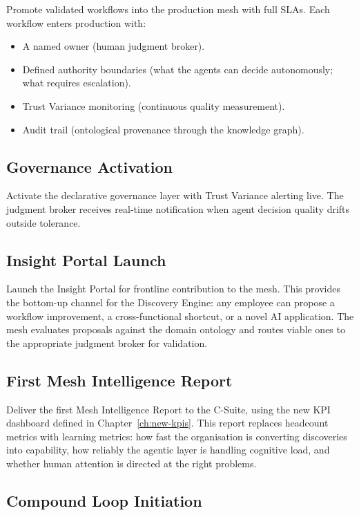 Promote validated workflows into the production mesh with full SLAs. Each workflow enters production with:

\begin{itemize}
  \item A named owner (human judgment broker).
  \item Defined authority boundaries (what the agents can decide autonomously; what requires escalation).
  \item Trust Variance monitoring (continuous quality measurement).
  \item Audit trail (ontological provenance through the knowledge graph).
\end{itemize}

\subsection{Governance Activation}

Activate the declarative governance layer with Trust Variance alerting live. The judgment broker receives real-time notification when agent decision quality drifts outside tolerance.

\subsection{Insight Portal Launch}

Launch the Insight Portal for frontline contribution to the mesh. This provides the bottom-up channel for the Discovery Engine: any employee can propose a workflow improvement, a cross-functional shortcut, or a novel AI application. The mesh evaluates proposals against the domain ontology and routes viable ones to the appropriate judgment broker for validation.

\subsection{First Mesh Intelligence Report}

Deliver the first Mesh Intelligence Report to the C-Suite, using the new KPI dashboard defined in Chapter~\ref{ch:new-kpis}. This report replaces headcount metrics with learning metrics: how fast the organisation is converting discoveries into capability, how reliably the agentic layer is handling cognitive load, and whether human attention is directed at the right problems.

\subsection{Compound Loop Initiation}

